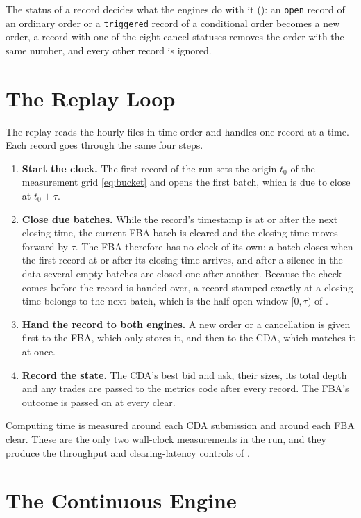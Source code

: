 The status of a record decides what the engines do with it
(): an \texttt{open} record of an ordinary order or
a \texttt{triggered} record of a conditional order becomes a new order, a
record with one of the eight cancel statuses removes the order with the same
number, and every other record is ignored.

\section{The Replay Loop}
\label{sec:implreplay}

The replay reads the hourly files in time order and handles one record at a
time. Each record goes through the same four steps.

\begin{enumerate}
  \item \textbf{Start the clock.} The first record of the run sets the
  origin $t_0$ of the measurement grid \eqref{eq:bucket} and opens the first
  batch, which is due to close at $t_0 + \tau$.
  \item \textbf{Close due batches.} While the record's timestamp is at or
  after the next closing time, the current FBA batch is cleared and the
  closing time moves forward by $\tau$. The FBA therefore has no clock of
  its own: a batch closes when the first record at or after its closing
  time arrives, and after a silence in the data several empty batches are
  closed one after another. Because the check comes before the record is
  handed over, a record stamped exactly at a closing time belongs to the
  next batch, which is the half-open window $[0, \tau)$ of
  .
  \item \textbf{Hand the record to both engines.} A new order or a
  cancellation is given first to the FBA, which only stores it, and then to
  the CDA, which matches it at once.
  \item \textbf{Record the state.} The CDA's best bid and ask, their sizes,
  its total depth and any trades are passed to the metrics code after every
  record. The FBA's outcome is passed on at every clear.
\end{enumerate}

Computing time is measured around each CDA submission and around each FBA
clear. These are the only two wall-clock measurements in the run, and they
produce the throughput and clearing-latency controls of
.

\section{The Continuous Engine}
\label{sec:implcda}

